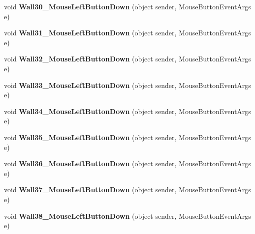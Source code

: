 \begin{DoxyCompactItemize}
void {\bfseries Wall30\+\_\+\+Mouse\+Left\+Button\+Down} (object sender, Mouse\+Button\+Event\+Args e)
\item 
\mbox{\label{class_r6_1_1_border_window_ad734be8e0986343151e192fd9b7f2b63}} 
void {\bfseries Wall31\+\_\+\+Mouse\+Left\+Button\+Down} (object sender, Mouse\+Button\+Event\+Args e)
\item 
\mbox{\label{class_r6_1_1_border_window_a5ca94addd01591b7e99fb9b4d24b7804}} 
void {\bfseries Wall32\+\_\+\+Mouse\+Left\+Button\+Down} (object sender, Mouse\+Button\+Event\+Args e)
\item 
\mbox{\label{class_r6_1_1_border_window_a4adbb06a29b8474193bd6dec5711ed68}} 
void {\bfseries Wall33\+\_\+\+Mouse\+Left\+Button\+Down} (object sender, Mouse\+Button\+Event\+Args e)
\item 
\mbox{\label{class_r6_1_1_border_window_a4ccbc73c833b72c0bcf0b733811bb83d}} 
void {\bfseries Wall34\+\_\+\+Mouse\+Left\+Button\+Down} (object sender, Mouse\+Button\+Event\+Args e)
\item 
\mbox{\label{class_r6_1_1_border_window_afcdf4a0b6f0c333a8c9661aabc49d21c}} 
void {\bfseries Wall35\+\_\+\+Mouse\+Left\+Button\+Down} (object sender, Mouse\+Button\+Event\+Args e)
\item 
\mbox{\label{class_r6_1_1_border_window_a9eac2dfc8431b8b58e74d5537e75d3d4}} 
void {\bfseries Wall36\+\_\+\+Mouse\+Left\+Button\+Down} (object sender, Mouse\+Button\+Event\+Args e)
\item 
\mbox{\label{class_r6_1_1_border_window_a2624a0df0a61ae0ae83c6d66ed23ccf3}} 
void {\bfseries Wall37\+\_\+\+Mouse\+Left\+Button\+Down} (object sender, Mouse\+Button\+Event\+Args e)
\item 
\mbox{\label{class_r6_1_1_border_window_a8de62120df4a3c40e1a64ce43d6bea56}} 
void {\bfseries Wall38\+\_\+\+Mouse\+Left\+Button\+Down} (object sender, Mouse\+Button\+Event\+Args e)
\item 
\mbox{\label{class_r6_1_1_border_window_afd39e068bf527dc6d4417bdeb15de8a7}} 

\end{DoxyCompactItemize}
